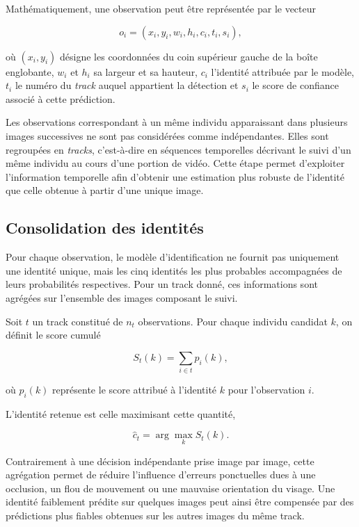 \documentclass[11pt,a4paper]{report}
\begin{document}
Mathématiquement, une observation peut être représentée par le vecteur

\begin{equation}
o_i=
\left(
x_i,
y_i,
w_i,
h_i,
c_i,
t_i,
s_i
\right),
\end{equation}

où $(x_i,y_i)$ désigne les coordonnées du coin supérieur gauche de la boîte
englobante, $w_i$ et $h_i$ sa largeur et sa hauteur, $c_i$ l'identité attribuée
par le modèle, $t_i$ le numéro du \emph{track} auquel appartient la détection et
$s_i$ le score de confiance associé à cette prédiction.

Les observations correspondant à un même individu apparaissant dans plusieurs
images successives ne sont pas considérées comme indépendantes. Elles sont
regroupées en \emph{tracks}, c'est-à-dire en séquences temporelles décrivant le
suivi d'un même individu au cours d'une portion de vidéo. Cette étape permet
d'exploiter l'information temporelle afin d'obtenir une estimation plus robuste
de l'identité que celle obtenue à partir d'une unique image.

\subsection*{Consolidation des identités}

Pour chaque observation, le modèle d'identification ne fournit pas uniquement
une identité unique, mais les cinq identités les plus probables accompagnées de
leurs probabilités respectives. Pour un track donné, ces informations sont
agrégées sur l'ensemble des images composant le suivi.

Soit $t$ un track constitué de $n_t$ observations. Pour chaque individu
candidat $k$, on définit le score cumulé

\begin{equation}
S_t(k)
=
\sum_{i\in t}
p_i(k),
\end{equation}

où $p_i(k)$ représente le score attribué à l'identité $k$ pour l'observation
$i$.

L'identité retenue est celle maximisant cette quantité,

\begin{equation}
\widehat c_t
=
\arg\max_k S_t(k).
\end{equation}

Contrairement à une décision indépendante prise image par image, cette
agrégation permet de réduire l'influence d'erreurs ponctuelles dues à une
occlusion, un flou de mouvement ou une mauvaise orientation du visage. Une
identité faiblement prédite sur quelques images peut ainsi être compensée par
des prédictions plus fiables obtenues sur les autres images du même track.
\end{document}

